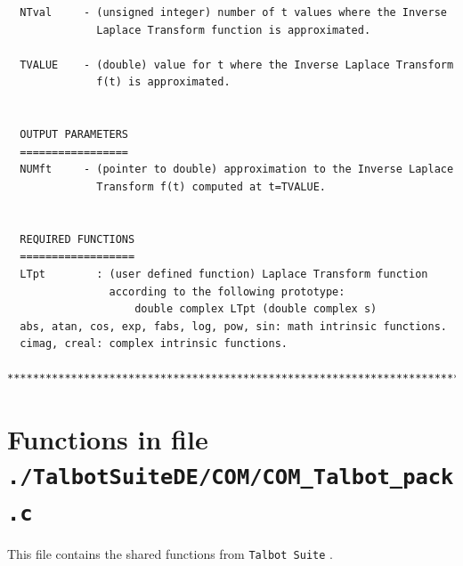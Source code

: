\documentclass[a4paper,10pt]{report}%
\begin{document}
\begin{lstlisting}
  NTval     - (unsigned integer) number of t values where the Inverse
              Laplace Transform function is approximated.

  TVALUE    - (double) value for t where the Inverse Laplace Transform
              f(t) is approximated.


  OUTPUT PARAMETERS
  =================
  NUMft     - (pointer to double) approximation to the Inverse Laplace
              Transform f(t) computed at t=TVALUE.


  REQUIRED FUNCTIONS
  ==================
  LTpt        : (user defined function) Laplace Transform function
                according to the following prototype:
                    double complex LTpt (double complex s)
  abs, atan, cos, exp, fabs, log, pow, sin: math intrinsic functions.
  cimag, creal: complex intrinsic functions.

*****************************************************************************\
\end{lstlisting}



\section{Functions in file {\large\tt ./TalbotSuiteDE/COM/COM\_Talbot\_pack.c}}
This file contains the shared functions from {\tt Talbot Suite} \cite{TALBOT_SUITE:2014}.
\end{document}
